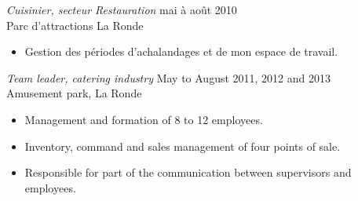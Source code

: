 \documentclass{res}
\newcommand{\inEnglish}[1]{#1}
\begin{document}
\begin{resume}
{	{\sl Cuisinier, secteur Restauration}
		\hfill mai à août 2010 \\
	Parc d'attractions La Ronde

	\vspace{0.05in}
	\begin{itemize} \itemsep -2pt
		\item Gestion des périodes d’achalandages et de mon espace de travail.
	\end{itemize}
}

\inEnglish{
	{\sl Team leader, catering industry}
		\hfill May to August 2011, 2012 and 2013 \\
	Amusement park, La Ronde

	\vspace{0.05in}
	\begin{itemize} \itemsep -2pt
		\item Management and formation of 8 to 12 employees.
		\item Inventory, command and sales management of four points of sale.
		\item Responsible for part of the communication between supervisors and employees.
	\end{itemize}



}

\vspace{0.1in}

\end{resume}
\end{document}
